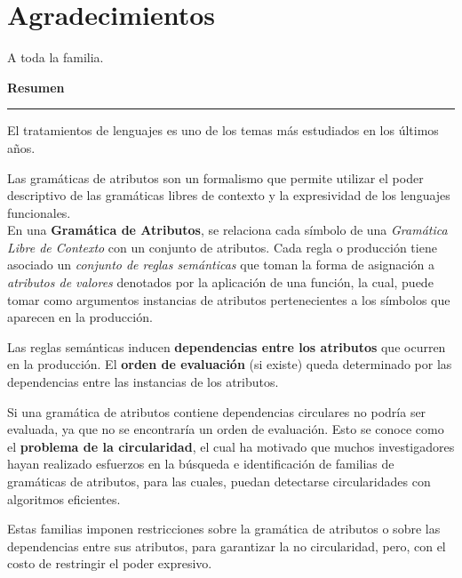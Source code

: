 \documentclass[a4paper,11pt]{ThesisStyle}
\begin{document}


\dominitoc


\cleardoublepage

\section*{Agradecimientos}

A toda la familia.

\cleardoublepage

\begin{vcenterpage}

{\large\textbf{Resumen\\}}
\noindent\rule[2pt]{\textwidth}{0.5pt}

El tratamientos de lenguajes es uno de los temas más estudiados en los últimos años.

Las gramáticas de atributos son un formalismo que permite utilizar el poder descriptivo de las gramáticas libres de contexto y la expresividad de los lenguajes funcionales.\\ 

En una \textbf{Gramática de Atributos}, se relaciona cada símbolo de una \textit{Gramática Libre de Contexto} con un conjunto de atributos. Cada regla o producción tiene asociado un \textit{conjunto de reglas semánticas} que toman la forma de asignación a \textit{atributos de valores} denotados por la aplicación de una función, la cual, puede tomar como argumentos instancias de atributos pertenecientes a los símbolos que aparecen en la producción.

Las reglas semánticas inducen \textbf{dependencias entre los atributos} que ocurren en la producción. El \textbf{orden de evaluación} (si existe) queda determinado por las dependencias entre las instancias de los atributos.

Si una gramática de atributos contiene dependencias circulares no podría ser evaluada, ya que no se encontraría un orden de evaluación. Esto se conoce como el \textbf{problema de la circularidad}, el cual ha motivado que muchos investigadores hayan realizado esfuerzos en la búsqueda e identificación de familias de gramáticas de atributos, para las cuales, puedan detectarse circularidades con algoritmos eficientes.

Estas familias imponen restricciones sobre la gramática de atributos o sobre las dependencias entre sus atributos, para garantizar la no circularidad, pero, con el costo de restringir el poder expresivo.


\end{vcenterpage}
\end{document}
